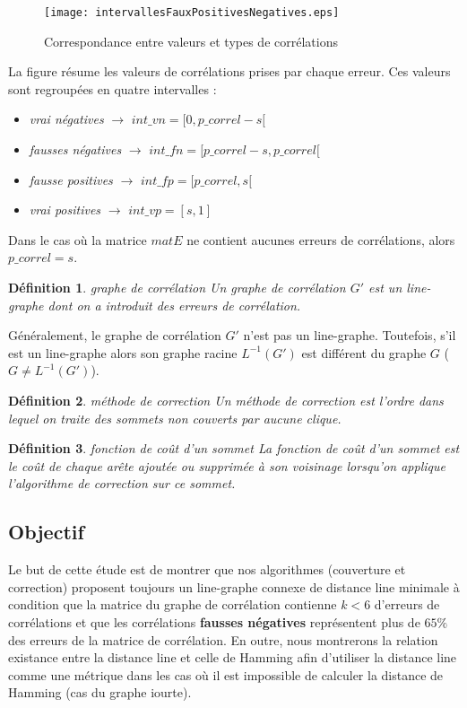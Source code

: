 \documentclass[onecolumn, 12pt]{book}
\newtheorem{definition}{D\'efinition}
\begin{document}
\begin{figure}[htb!] 
\centering
\texttt{[image: intervallesFauxPositivesNegatives.eps]}
\caption{ Correspondance entre valeurs et types de corr\'elations }
\label{intervallesFauxPositivesNegatives} 
\end{figure}

La figure r\'esume les valeurs de corr\'elations prises par chaque erreur. Ces valeurs sont regroup\'ees en quatre intervalles :
\begin{itemize}
\item {\em vrai n\'egatives} $\rightarrow$ $int\_vn = [0, p\_correl - s[$
\item {\em fausses n\'egatives} $\rightarrow$ $int\_fn = [p\_correl - s, p\_correl[$
\item {\em fausse positives} $\rightarrow$ $int\_fp = [p\_correl, s[$
\item {\em vrai positives} $\rightarrow$ $int\_vp = [s, 1]$
\end{itemize}
Dans le cas o\`u la matrice $matE$ ne contient aucunes erreurs de corr\'elations, alors $p\_correl = s$.

\begin{definition}{ graphe de corr\'elation } \newline
Un graphe de corr\'elation $G'$ est un line-graphe dont on a introduit des erreurs de corr\'elation.
\end{definition}
G\'en\'eralement, le graphe de corr\'elation $G'$ n'est pas  un line-graphe. Toutefois, s'il est un line-graphe alors son graphe racine $L^{-1}(G')$ est diff\'erent du graphe $G$ ($G \neq L^{-1}(G')$).
\begin{definition}{ m\'ethode de correction } \newline
Un m\'ethode de correction est l'ordre dans lequel on traite des sommets non couverts par aucune clique.
\end{definition}

\begin{definition}{ fonction de co\^ut d'un sommet} \newline
La fonction de co\^ut d'un sommet est le co\^ut de chaque ar\^ete ajout\'ee ou supprim\'ee \`a son voisinage lorsqu'on applique l'algorithme de correction sur ce sommet.
\end{definition}

\subsection{Objectif}
Le but de cette \'etude est de montrer que nos algorithmes (couverture et correction) proposent
toujours un line-graphe connexe de distance line minimale
\`a condition que la matrice du graphe de corr\'elation contienne $k<6$ d'erreurs de corr\'elations
et que les corr\'elations {\bf fausses n\'egatives} repr\'esentent plus de $65\%$ des erreurs de la matrice de corr\'elation.
En outre, nous montrerons la relation existance entre la distance line et celle de Hamming afin d'utiliser la distance line comme une m\'etrique dans les cas o\`u il est impossible de calculer la distance de Hamming (cas du graphe iourte).
\end{document}
